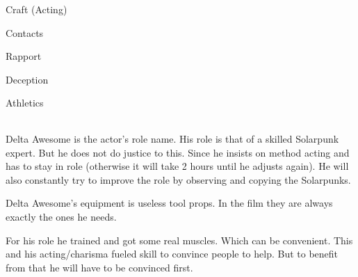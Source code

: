 \begin{npcBox}[title=Delta Awesome]

    \begin{aspects}
    \item {}
    \item {}    
    \item {}    
    \end{aspects}
    
    \begin{skills}
    \item {} Craft (Acting)
    \item {} Contacts
    \item {} Rapport
    \item {} Deception
    \item {} Athletics
    \end{skills}
    
    \begin{stunts}
    \item {}
    \end{stunts}
    
    \begin{stressSection}
    \end{stressSection}
    \begin{tabularx}{\textwidth}{ XX }
    \end{tabularx}
    
    \begin{consequences}
    \item {}
    \item {}
    \item {}
    \end{consequences}
    
    \begin{npcDescription}
    Delta Awesome is the actor's role name. His role is that of a skilled Solarpunk expert. But he
    does not do justice to this. Since he insists on method acting and has to stay in role (otherwise it will take 2 hours until he adjusts again). He will also constantly try to improve the role by observing and copying the Solarpunks.
    
    Delta Awesome's equipment is useless tool props. In the film they are always exactly the ones he needs. 

    For his role he trained and got some real muscles. Which can be convenient. This and his acting/charisma fueled skill to convince people to help. But to benefit from that he will have to be convinced first.
    \end{npcDescription}
    
\end{npcBox}


